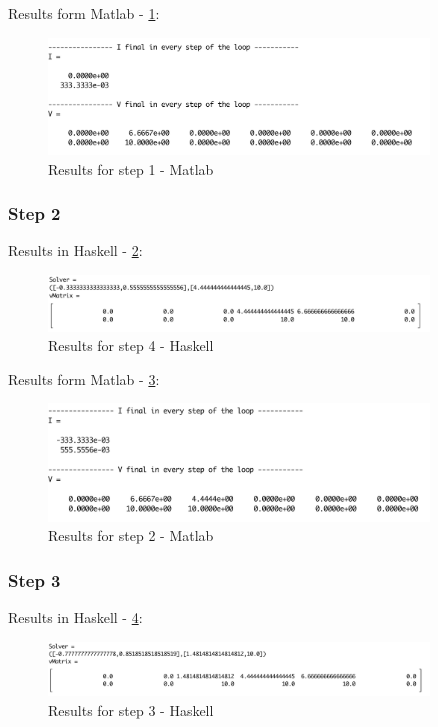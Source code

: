 Results form Matlab - \cref{m1}:

\begin{figure}[H]
   \centering
   \includegraphics[width=0.9\textwidth]{img/m1.png}
   \caption{Results for step 1 - Matlab}
   \label{m1}
\end{figure}


\subsubsection{Step 2}

Results in Haskell - \cref{h2}:

\begin{figure}[H]
   \centering
   \includegraphics[width=0.9\textwidth]{img/h2.png}
   \caption{Results for step 4 - Haskell}
   \label{h2}
\end{figure}

Results form Matlab - \cref{m2}:

\begin{figure}[H]
   \centering
   \includegraphics[width=0.9\textwidth]{img/m2.png}
   \caption{Results for step 2 - Matlab}
   \label{m2}
\end{figure}


\subsubsection{Step 3}

Results in Haskell - \cref{h3}:

\begin{figure}[H]
   \centering
   \includegraphics[width=0.9\textwidth]{img/h3.png}
   \caption{Results for step 3 - Haskell}
   \label{h3}
\end{figure}

